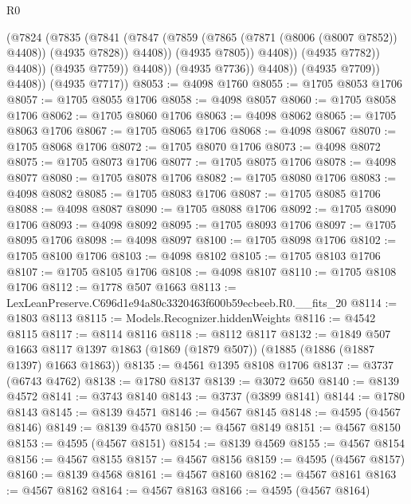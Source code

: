 \begin{lexlean}{R0}
\begin{coremodule}
                                (@7824
                                  (@7835
                                    (@7841
                                      (@7847
                                        (@7859
                                          (@7865 (@7871 (@8006 (@8007 @7852)) @4408))
                                          (@4935 @7828))
                                        @4408))
                                    (@4935 @7805))
                                  @4408))
                              (@4935 @7782))
                            @4408))
                        (@4935 @7759))
                      @4408))
                  (@4935 @7736))
                @4408))
            (@4935 @7709))
          @4408))
      (@4935 @7717))
@8053 := @4098 @1760
@8055 := @1705 @8053 @1706
@8057 := @1705 @8055 @1706
@8058 := @4098 @8057
@8060 := @1705 @8058 @1706
@8062 := @1705 @8060 @1706
@8063 := @4098 @8062
@8065 := @1705 @8063 @1706
@8067 := @1705 @8065 @1706
@8068 := @4098 @8067
@8070 := @1705 @8068 @1706
@8072 := @1705 @8070 @1706
@8073 := @4098 @8072
@8075 := @1705 @8073 @1706
@8077 := @1705 @8075 @1706
@8078 := @4098 @8077
@8080 := @1705 @8078 @1706
@8082 := @1705 @8080 @1706
@8083 := @4098 @8082
@8085 := @1705 @8083 @1706
@8087 := @1705 @8085 @1706
@8088 := @4098 @8087
@8090 := @1705 @8088 @1706
@8092 := @1705 @8090 @1706
@8093 := @4098 @8092
@8095 := @1705 @8093 @1706
@8097 := @1705 @8095 @1706
@8098 := @4098 @8097
@8100 := @1705 @8098 @1706
@8102 := @1705 @8100 @1706
@8103 := @4098 @8102
@8105 := @1705 @8103 @1706
@8107 := @1705 @8105 @1706
@8108 := @4098 @8107
@8110 := @1705 @8108 @1706
@8112 := @1778 @507 @1663
@8113 := LexLeanPreserve.C696d1e94a80c3320463f600b59ecbeeb.R0.__fits_20
@8114 := @1803 @8113
@8115 := Models.Recognizer.hiddenWeights
@8116 := @4542 @8115
@8117 := @8114 @8116
@8118 := @8112 @8117
@8132 := @1849
    @507
    @1663
    @8117
    @1397
    @1863
    (@1869 (@1879 @507))
    (@1885 (@1886 (@1887 @1397) @1663 @1863))
@8135 := @4561 @1395 @8108 @1706
@8137 := @3737 (@6743 @4762)
@8138 := @1780 @8137
@8139 := @3072 @650
@8140 := @8139 @4572
@8141 := @3743 @8140
@8143 := @3737 (@3899 @8141)
@8144 := @1780 @8143
@8145 := @8139 @4571
@8146 := @4567 @8145
@8148 := @4595 (@4567 @8146)
@8149 := @8139 @4570
@8150 := @4567 @8149
@8151 := @4567 @8150
@8153 := @4595 (@4567 @8151)
@8154 := @8139 @4569
@8155 := @4567 @8154
@8156 := @4567 @8155
@8157 := @4567 @8156
@8159 := @4595 (@4567 @8157)
@8160 := @8139 @4568
@8161 := @4567 @8160
@8162 := @4567 @8161
@8163 := @4567 @8162
@8164 := @4567 @8163
@8166 := @4595 (@4567 @8164)

\end{coremodule}
\end{lexlean}

